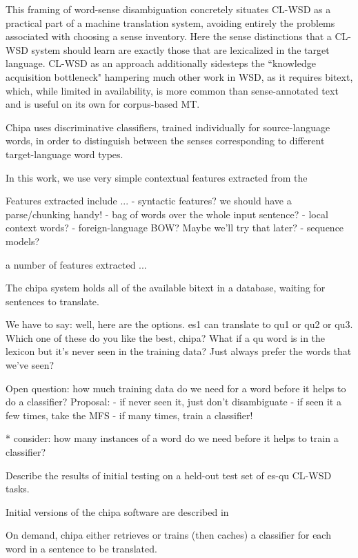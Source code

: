 \documentclass[10pt, a4paper]{article}
\begin{document}
This framing of word-sense disambiguation concretely situates CL-WSD as a
practical part of a machine translation system, avoiding entirely the problems
associated with choosing a sense inventory. Here the sense distinctions that a
CL-WSD system should learn are exactly those that are lexicalized in the target
language. CL-WSD as an approach additionally sidesteps the ``knowledge
acquisition bottleneck" \cite{agirre2006word}
hampering much other work in WSD, as it requires bitext, which, while limited
in availability, is more common than sense-annotated text and is useful on its
own for corpus-based MT.

Chipa uses discriminative classifiers, trained individually for source-language
words, in order to distinguish between the senses corresponding to different
target-language word types.

In this work, we use very simple contextual features extracted from the 

Features extracted include ...
- syntactic features? we should have a parse/chunking handy!
- bag of words over the whole input sentence?
- local context words?
- foreign-language BOW? Maybe we'll try that later?
- sequence models?

a number of features extracted ...

The chipa system holds all of the available bitext in a database, waiting for
sentences to translate.


We have to say: well, here are the options. es1 can translate to qu1 or qu2 or
qu3. Which one of these do you like the best, chipa?
What if a qu word is in the lexicon but it's never seen in the training data?
Just always prefer the words that we've seen?


Open question: how much training data do we need for a word before it helps to
do a classifier?
Proposal:
- if never seen it, just don't disambiguate
- if seen it a few times, take the MFS
- if many times, train a classifier!





* consider: how many instances of a word do we need before it helps to train a
classifier?

Describe the results of initial testing on a held-out test set of es-qu CL-WSD
tasks.


Initial versions of the chipa software are described in
\cite{rudnick-gasser:2013:HyTra}

On demand, chipa either retrieves or trains (then caches) a classifier
for each word in a sentence to be translated.
\end{document}
